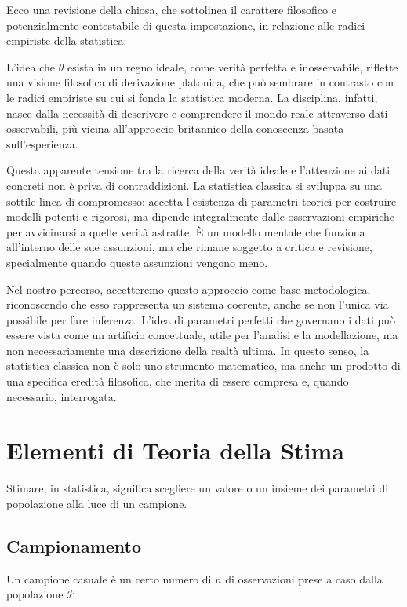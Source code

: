 \documentclass[
  11pt,
]{book}
\theoremstyle{mytheoremstyle}
\theoremstyle{mydefstyle}
\begin{document}
Ecco una revisione della chiosa, che sottolinea il carattere filosofico e potenzialmente contestabile di questa impostazione, in relazione alle radici empiriste della statistica:

L'idea che \(\theta\) esista in un regno ideale, come verità perfetta e inosservabile, riflette una visione filosofica di derivazione platonica, che può sembrare in contrasto con le radici empiriste su cui si fonda la statistica moderna. La disciplina, infatti, nasce dalla necessità di descrivere e comprendere il mondo reale attraverso dati osservabili, più vicina all'approccio britannico della conoscenza basata sull'esperienza.

Questa apparente tensione tra la ricerca della verità ideale e l'attenzione ai dati concreti non è priva di contraddizioni. La statistica classica si sviluppa su una sottile linea di compromesso: accetta l'esistenza di parametri teorici per costruire modelli potenti e rigorosi, ma dipende integralmente dalle osservazioni empiriche per avvicinarsi a quelle verità astratte. È un modello mentale che funziona all'interno delle sue assunzioni, ma che rimane soggetto a critica e revisione, specialmente quando queste assunzioni vengono meno.

Nel nostro percorso, accetteremo questo approccio come base metodologica, riconoscendo che esso rappresenta un sistema coerente, anche se non l'unica via possibile per fare inferenza. L'idea di parametri perfetti che governano i dati può essere vista come un artificio concettuale, utile per l'analisi e la modellazione, ma non necessariamente una descrizione della realtà ultima. In questo senso, la statistica classica non è solo uno strumento matematico, ma anche un prodotto di una specifica eredità filosofica, che merita di essere compresa e, quando necessario, interrogata.

\chapter{Elementi di Teoria della Stima}\label{elementi-di-teoria-della-stima}

Stimare, in statistica, significa scegliere un valore o un insieme dei parametri di popolazione
alla luce di un campione.

\section{Campionamento}\label{campionamento}

Un campione casuale è un certo numero di \(n\) di osservazioni prese a caso dalla popolazione \(\mathscr{P}\)
\end{document}
